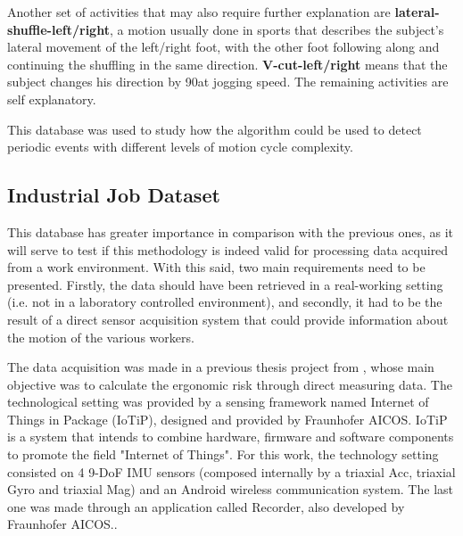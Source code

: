 Another set of activities that may also require further explanation are \textbf{lateral-shuffle-left/right}, a motion usually done in sports that describes the subject's lateral movement of the left/right foot, with the other foot following along and continuing the shuffling in the same direction. \textbf{V-cut-left/right} means that the subject changes his direction by 90\degree at jogging speed. The remaining activities are self explanatory.

This database was used to study how the algorithm could be used to detect periodic events with different levels of motion cycle complexity. 

\subsection{Industrial Job Dataset}

This database has greater importance in comparison with the previous ones, as it will serve to test if this methodology is indeed valid for processing data acquired from a work environment. With this said, two main requirements need to be presented. Firstly, the data should have been retrieved in a real-working setting (i.e. not in a laboratory controlled environment), and secondly, it had to be the result of a direct sensor acquisition system that could provide information about the motion of the various workers.

The data acquisition was made in a previous thesis project from \cite{Santos2019}, whose main objective was to calculate the ergonomic risk through  direct measuring data. 
The technological setting was provided by a sensing framework named Internet of Things in Package (IoTiP), designed and provided by Fraunhofer AICOS. IoTiP is a system that intends to combine hardware, firmware and software components to promote the field "Internet of Things"\cite{FraunhoferAICOS}. For this work, the technology setting consisted on 4 9-\acrshort{DoF} \gls{IMU} sensors (composed internally by a triaxial \gls{Acc}, triaxial \gls{Gyro} and triaxial \gls{Mag}) and an Android wireless communication system. The last one was made through an application called Recorder, also developed by Fraunhofer AICOS.\cite{Santos2019}.


